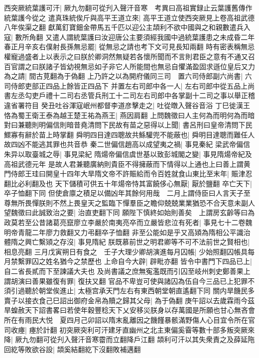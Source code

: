 西突厥統葉護可汗|{
	厥九勿翻可從刋入聲汗音寒　考異曰高祖實録止云葉護舊傳作統葉護今從之}
遣真珠統俟斤與高平王道立來|{
	高平王道立使西突厥見上卷高祖武德八年俟渠之翻}
獻萬釘寶鈿金帶馬五千匹以迎公主頡利不欲中國與之和親數遣兵入寇|{
	數所角翻}
又遣人謂統葉護曰汝迎唐公主要須經我國中過統葉護患之未成昏二年春正月辛亥右僕射長孫無忌罷|{
	從無忌之請也考下文可見長知兩翻}
時有密表稱無忌權寵過盛者上以表示之曰朕於卿洞然無疑若各懷所聞而不言則君臣之意有不通又召百官謂之曰朕諸子皆幼視無忌如子非它人所能間也無忌自懼滿盈固求遜位皇后又力為之請|{
	間古莧翻為于偽翻}
上乃許之以為開府儀同三司　置六司侍郎副六尚書|{
	六司侍郎吏部正四品上餘皆正四品下}
并置左右司郎中各一人|{
	左右司郎中從五品上尚書左丞勾吏戶禮十二司右丞管兵刑工十二司左右司郎中各掌副十二司之事以舉正稽違省署符目}
癸丑吐谷渾寇岷州都督李道彦擊走之|{
	吐從暾入聲谷音浴}
丁巳徙漢王恪為蜀王衛王泰為越王楚王祐為燕王|{
	燕因肩翻}
上問魏徵曰人主何為而明何為而暗對曰兼聽則明偏信則暗昔堯清問下民故有苗之惡得以上聞|{
	書呂刑曰皇帝清問下民鰥寡有辭於苗上時掌翻}
舜明四目達四聰故共鯀驩兜不能蔽也|{
	舜明目達聰而難任人故四凶不能逃其罪也共音恭}
秦二世偏信趙高以成望夷之禍|{
	事見秦紀}
梁武帝偏信朱异以取臺城之辱|{
	事見梁紀}
隋煬帝偏信虞世基以致彭城閣之變|{
	事見隋煬帝紀及高祖武德元年}
是故人君兼聽廣納則貴臣不得擁蔽而下情得以上通也上曰善上謂黄門侍郎王珪曰開皇十四年大旱隋文帝不許賑給而令百姓就食山東比至末年|{
	賑津忍翻比必利翻及也}
天下儲積可供五十年煬帝恃其富饒侈心無厭|{
	厭於鹽翻}
卒亡天下|{
	卒子恤翻下同}
但使倉廪之積足以備凶年其餘何用哉　二月上謂侍臣曰人言天子至尊無所畏憚朕則不然上畏皇天之監臨下憚羣臣之瞻仰兢兢業業猶恐不合天意未副人望魏徵曰此誠致治之要|{
	治直吏翻下同}
願陛下慎終如始則善矣　上謂房玄齡等曰為政莫若至公昔諸葛亮竄廖立李嚴於南夷亮卒而立嚴皆悲泣有死者|{
	事見七十二卷魏明帝青龍二年廖力救翻又力弔翻卒子恤翻}
非至公能如是乎又高熲為隋相公平識治體隋之興亡繫熲之存沒|{
	事見隋紀}
朕既慕前世之明君卿等不可不法前世之賢相也|{
	相息亮翻}
三月戊寅朔日有食之　壬子大理少卿胡演進每月囚帳|{
	少始照翻囚帳具每月禁繫罪囚之姓名猶今之禁歷也}
上命自今大辟|{
	辟毗亦翻}
皆令中書門下四品已上|{
	自二省長貳而下至諫議大夫也}
及尚書議之庶無寃濫既而引囚至岐州刺史鄭善果上謂胡演曰善果雖復有罪|{
	復扶又翻}
官品不卑豈可使與諸囚為伍自今三品已上犯罪不須引過聽於朝堂俟進止|{
	太極宫承天門左右有東西朝堂朝直遙翻下同}
關内旱饑民多賣子以接衣食己巳詔出御府金帛為贖之歸其父母|{
	為于偽翻}
庚午詔以去歲霖雨今茲旱蝗赦天下詔書畧曰若使年穀豐稔天下乂安移災朕身以存萬國是所願也甘心無吝會所在有雨民大悦　夏四月己卯詔以隋末亂離因之饑饉暴骸滿野傷人心目宜令所在官司收瘞|{
	瘞於計翻}
初突厥突利可汗建牙直幽州之北主東偏奚霫等數十部多叛突厥來降|{
	厥九勿翻可從刋入聲汗音寒霤而立翻降戶江翻}
頡利可汗以其失衆責之及薛延陁回紇等敗欲谷設|{
	頡奚結翻紇下沒翻敗補邁翻}
